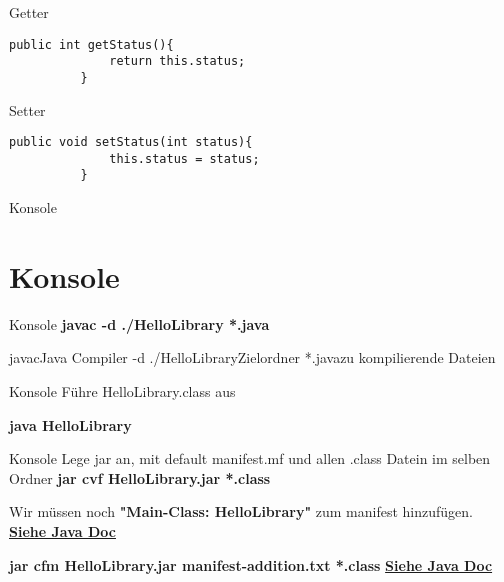 \documentclass[10pt]{beamer}
\begin{document}
\begin{frame}[fragile]{Getter}
    \begin{lstlisting}[basicstyle=\ttfamily\scriptsize,gobble=8]
          public int getStatus(){
              return this.status;
          }
    \end{lstlisting}
\end{frame}

\begin{frame}[fragile]{Setter}
    \begin{lstlisting}[basicstyle=\ttfamily\scriptsize,gobble=8]
          public void setStatus(int status){  
              this.status = status;
          }
    \end{lstlisting}
\end{frame}

\begin{frame}[fragile]{Konsole}
    \section{Konsole}
\end{frame}

\begin{frame}[fragile]{Konsole}
     \textcolor{mygreen}{\textbf{javac -d ./HelloLibrary *.java}}\newline

     javac\qquad\qquad\qquad Java Compiler\newline
    -d ./HelloLibrary\qquad Zielordner\newline
    *.java\qquad\qquad\qquad\quad zu kompilierende Dateien\newline
\end{frame}

\begin{frame}[fragile]{Konsole}
    Führe HelloLibrary.class aus
    
   \textcolor{mygreen}{\textbf{java HelloLibrary}}
\end{frame}

\begin{frame}[fragile]{Konsole}
    Lege jar an, mit default manifest.mf und \newline
    allen .class Datein im selben Ordner\newline
    \textcolor{mygreen}{\textbf{ jar cvf HelloLibrary.jar *.class}}\newline

    Wir müssen noch\newline
    \textcolor{mygreen}{\textbf{"Main-Class: HelloLibrary"}}\newline
    zum manifest hinzufügen.\newline
    \textcolor{mymauve}{\textbf{\href{https://docs.oracle.com/javase/tutorial/deployment/jar/appman.html}{Siehe Java Doc}\\}}

    \textcolor{mygreen}{\textbf{jar cfm HelloLibrary.jar manifest-addition.txt *.class}}\newline
    \textcolor{mymauve}{\textbf{\href{https://docs.oracle.com/javase/tutorial/deployment/jar/modman.html}{Siehe Java Doc}\\}}
\end{frame}
\end{document}
